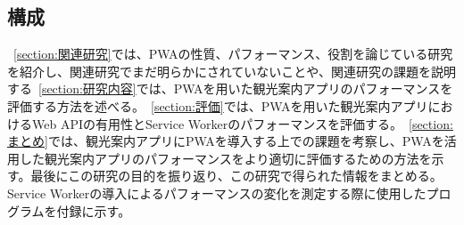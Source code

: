 \subsection{構成}
\label{subsection:構成}
~\autoref{section:関連研究}では、PWAの性質、パフォーマンス、役割を論じている研究を紹介し、関連研究でまだ明らかにされていないことや、関連研究の課題を説明する~\autoref{section:研究内容}では、PWAを用いた観光案内アプリのパフォーマンスを評価する方法を述べる。~\autoref{section:評価}では、PWAを用いた観光案内アプリにおけるWeb APIの有用性とService Workerのパフォーマンスを評価する。~\autoref{section:まとめ}では、観光案内アプリにPWAを導入する上での課題を考察し、PWAを活用した観光案内アプリのパフォーマンスをより適切に評価するための方法を示す。最後にこの研究の目的を振り返り、この研究で得られた情報をまとめる。Service Workerの導入によるパフォーマンスの変化を測定する際に使用したプログラムを付録に示す。
